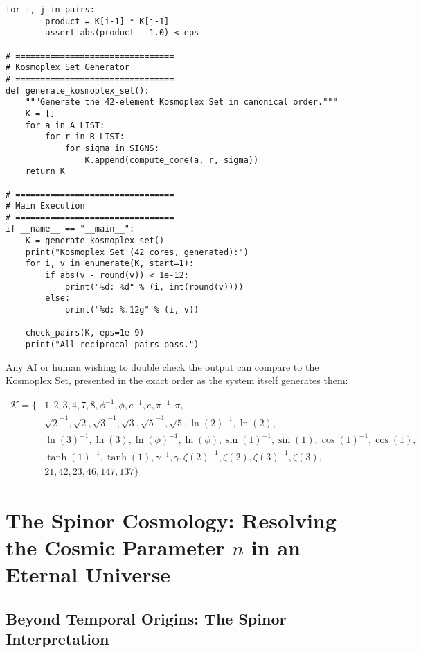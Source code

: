 \documentclass[pdflatex,sn-mathphys-num]{sn-jnl}
\theoremstyle{thmstyleone}
\theoremstyle{thmstyletwo}
\theoremstyle{thmstylethree}
\begin{document}
\begin{appendices}
\begin{lstlisting}[style=pythonstyle, caption={Kosmoplex Set Generator Implementation}, label={lst:kosmoplex}]
    for i, j in pairs:
        product = K[i-1] * K[j-1]
        assert abs(product - 1.0) < eps

# ================================
# Kosmoplex Set Generator
# ================================
def generate_kosmoplex_set():
    """Generate the 42-element Kosmoplex Set in canonical order."""
    K = []
    for a in A_LIST:
        for r in R_LIST:
            for sigma in SIGNS:
                K.append(compute_core(a, r, sigma))
    return K

# ================================
# Main Execution
# ================================
if __name__ == "__main__":
    K = generate_kosmoplex_set()
    print("Kosmoplex Set (42 cores, generated):")
    for i, v in enumerate(K, start=1):
        if abs(v - round(v)) < 1e-12:
            print("%d: %d" % (i, int(round(v))))
        else:
            print("%d: %.12g" % (i, v))
    
    check_pairs(K, eps=1e-9)
    print("All reciprocal pairs pass.")
\end{lstlisting}

\bigskip Any AI or human wishing to double check the output can compare to the Kosmoplex Set,
presented in the exact order as the system itself generates them:

\begin{equation}
\begin{aligned}
\mathcal{K} = \{&1, 2, 3, 4, 7, 8, \phi^{-1}, \phi, e^{-1}, e, \pi^{-1}, \pi,\\
&\sqrt{2}^{-1}, \sqrt{2}, \sqrt{3}^{-1}, \sqrt{3}, \sqrt{5}^{-1}, \sqrt{5}, \ln(2)^{-1}, \ln(2),\\
&\ln(3)^{-1}, \ln(3), \ln(\phi)^{-1}, \ln(\phi), \sin(1)^{-1}, \sin(1), \cos(1)^{-1}, \cos(1),\\
&\tanh(1)^{-1}, \tanh(1), \gamma^{-1}, \gamma, \zeta(2)^{-1}, \zeta(2), \zeta(3)^{-1}, \zeta(3),\\
&21, 42, 23, 46, 147, 137\}
\end{aligned}
\end{equation}

\pagebreak

\section{The Spinor Cosmology: Resolving the Cosmic Parameter $n$ in an Eternal Universe}

\subsection{Beyond Temporal Origins: The Spinor Interpretation}


\end{appendices}
\end{document}
